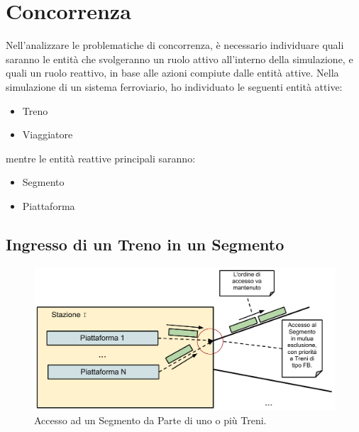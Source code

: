\newpage
\section{Concorrenza}

	Nell'analizzare le problematiche di concorrenza, è necessario individuare quali saranno le entità che svolgeranno un ruolo attivo all'interno della simulazione, e quali un ruolo reattivo, in base alle azioni compiute dalle entità attive. 
	Nella simulazione di un sistema ferroviario, ho individuato le seguenti entità attive:
		\begin{itemize}
			\item Treno
			\item Viaggiatore
		\end{itemize}
	mentre le entità reattive principali saranno:
		\begin{itemize}
			\item Segmento
			\item Piattaforma
		\end{itemize}
	
	\subsection{Ingresso di un Treno in un Segmento}\label{ingresso_segmento}

	\begin{figure}[htbp]
		\includegraphics[width=\textwidth,keepaspectratio]{imgs/ingresso_segmento.pdf}
		\caption{\footnotesize{Accesso ad un Segmento da Parte di uno o più Treni.}}
	\end{figure}

